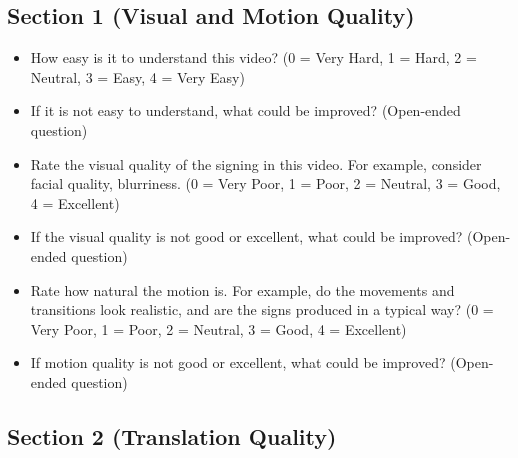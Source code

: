 \subsection{Section 1 (Visual and Motion Quality)}
\begin{itemize}
    \item How easy is it to understand this video? (0  = Very Hard, 1 = Hard, 2 = Neutral, 3 = Easy, 4 = Very Easy)
    \item If it is not easy to understand, what could be improved? (Open-ended question)
    \item Rate the visual quality of the signing in this video. For example, consider facial quality, blurriness. (0 = Very Poor, 1 = Poor, 2 = Neutral, 3 = Good, 4 = Excellent)
    \item If the visual quality is not good or excellent, what could be improved? (Open-ended question)
    \item Rate how natural the motion is. For example, do the movements and transitions look realistic, and are the signs produced in a typical way? (0 = Very Poor, 1 = Poor, 2 = Neutral, 3 = Good, 4 = Excellent)
    \item If motion quality is not good or excellent, what could be improved? (Open-ended question)
\end{itemize}

\subsection{Section 2 (Translation Quality)}

